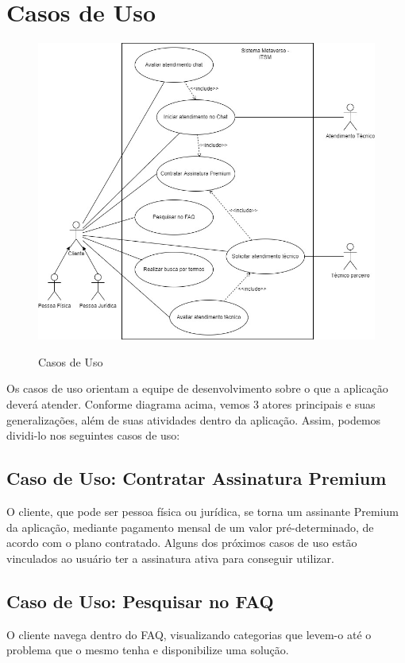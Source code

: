 \documentclass[
    12pt,               %
    openright,          %
    oneside,
    a4paper,            %
    english,            %
    brazil              %
   ]{ifsp-spo-inf-ctds}
\begin{document}
\section{Casos de Uso}
\begin{figure}[h]
\caption{Casos de Uso}

\centering %
\includegraphics[width=15cm]{anexos/Casos de Uso.jpeg} %
\label{figura:casosdeuso}
\end{figure}

Os casos de uso orientam a equipe de desenvolvimento sobre o que a aplicação deverá atender. Conforme diagrama acima, vemos 3 atores principais e suas generalizações, além de suas atividades dentro da aplicação. Assim, podemos dividi-lo nos seguintes casos de uso:

\subsection{Caso de Uso: Contratar Assinatura Premium}
O cliente, que pode ser pessoa física ou jurídica, se torna um assinante Premium da aplicação, mediante pagamento mensal de um valor pré-determinado, de acordo com o plano contratado. Alguns dos próximos casos de uso estão vinculados ao usuário ter a assinatura ativa para conseguir utilizar.

\subsection{Caso de Uso: Pesquisar no FAQ}
O cliente navega dentro do FAQ, visualizando categorias que levem-o até o problema que o mesmo tenha e disponibilize uma solução.
\end{document}
